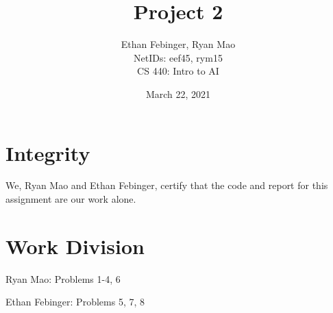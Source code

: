 \documentclass[12pt, twoside]{article}
\newcommand{\name}{Ethan Febinger, Ryan Mao \\ NetIDs: eef45, rym15}
\newcommand{\class}{CS 440: Intro to AI}
\newcommand{\hwTitle}{Project 2} %
\newcommand{\due}{March 22, 2021} %
\begin{document}
 
 
\title{\hwTitle} %
\author{\name\\  %
\class} %
\date{\due}
 
\maketitle

\section*{Integrity}

We, Ryan Mao and Ethan Febinger, certify that the code and report for this assignment are our work alone.

\section*{Work Division}

    Ryan Mao: Problems 1-4, 6 

    \noindent Ethan Febinger: Problems 5, 7, 8


\tableofcontents
\vfill
\pagebreak
\end{document}
